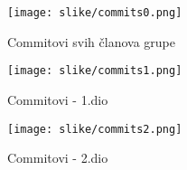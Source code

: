 		\begin{figure}[hp]
                    \centering
                    \texttt{[image: slike/commits0.png]}
                    \caption{Commitovi svih članova grupe}
                    \label{fig:DR_01}
                \end{figure}

	    \begin{figure}[hp]
                    \centering
                    \texttt{[image: slike/commits1.png]}
                    \caption{Commitovi - 1.dio}
                    \label{fig:DR_01}
                \end{figure}
			    

			\begin{figure}[hp]
                    \centering
                    \texttt{[image: slike/commits2.png]}
                    \caption{Commitovi - 2.dio}
                    \label{fig:DR_01}
                \end{figure}
			    
			\eject 
		
		
	